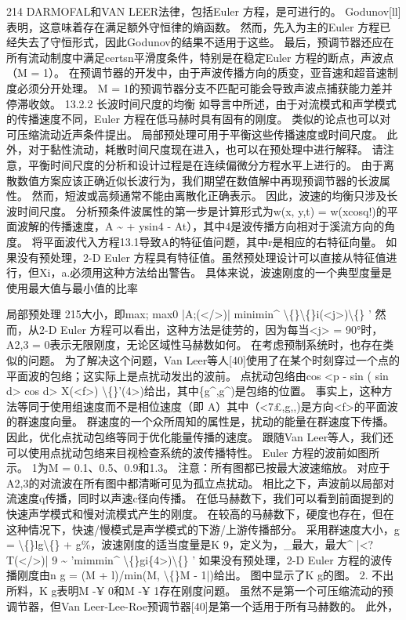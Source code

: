 \documentclass[UTF8,11pt,a4paper,openany,fontset=fandol]{ctexbook}
\begin{document}
214 DARMOFAL和VAN LEER法律，包括Euler 方程，是可进行的。 Godunov[ll]表明，这意味着存在满足额外守恒律的熵函数。 然而，先入为主的Euler 方程已经失去了守恒形式，因此Godunov的结果不适用于这些。 最后，预调节器还应在所有流动制度中满足certsn平滑度条件，特别是在稳定Euler 方程的断点，声波点（M = 1）。 在预调节器的开发中，由于声波传播方向的质变，亚音速和超音速制度必须分开处理。 M = 1的预调节器分支不匹配可能会导致声波点捕获能力差并停滞收敛。 13.2.2 长波时间尺度的均衡 如导言中所述，由于对流模式和声学模式的传播速度不同，Euler 方程在低马赫时具有固有的刚度。 类似的论点也可以对可压缩流动近声条件提出。 局部预处理可用于平衡这些传播速度或时间尺度。 此外，对于黏性流动，耗散时间尺度现在进入，也可以在预处理中进行解释。 请注意，平衡时间尺度的分析和设计过程是在连续偏微分方程水平上进行的。 由于离散数值方案应该正确近似长波行为，我们期望在数值解中再现预调节器的长波属性。 然而，短波或高频通常不能由离散化正确表示。 因此，波速的均衡只涉及长波时间尺度。 分析预条件波属性的第一步是计算形式为w(x, y,t) = w(xcosq!)的平面波解的传播速度，A \textasciitilde{} + ysin4 - At），其中4是波传播方向相对于溪流方向的角度。 将平面波代入方程13.1导致A的特征值问题，其中r是相应的右特征向量。 如果没有预处理，2-D Euler 方程具有特征值。虽然预处理设计可以直接从特征值进行，但Xi，a.必须用这种方法给出警告。 具体来说，波速刚度的一个典型度量是使用最大值与最小值的比率

局部预处理 215大小，即max; max0 |A;(</>)| minimin\textasciicircum{} \textbackslash\{\}\textbackslash\{\}i(<j>)\textbackslash\{\} ' 然而，从2-D Euler 方程可以看出，这种方法是徒劳的，因为每当<j> = 90°时，A2,3 = 0表示无限刚度，无论区域性马赫数如何。 在考虑预制系统时，也存在类似的问题。 为了解决这个问题，Van Leer等人[40]使用了在某个时刻穿过一个点的平面波的包络；这实际上是点扰动发出的波前。 点扰动包络由cos <p - sin ( sin d> cos d> X(<f>) \textbackslash\{\}'(4>)给出，其中\{g\textasciicircum{},g\textasciicircum{})是包络的位置。 事实上，这种方法等同于使用组速度而不是相位速度（即 A）其中（<7£,g,,)是方向<f>的平面波的群速度向量。 群速度的一个众所周知的属性是，扰动的能量在群速度下传播。 因此，优化点扰动包络等同于优化能量传播的速度。 跟随Van Leer等人，我们还可以使用点扰动包络来目视检查系统的波传播特性。 Euler 方程的波前如图所示。 1为M = 0.1、0.5、0.9和1.3。 注意：所有图都已按最大波速缩放。 对应于A2,3的对流波在所有图中都清晰可见为孤立点扰动。 相比之下，声波前以局部对流速度q传播，同时以声速c径向传播。 在低马赫数下，我们可以看到前面提到的快速声学模式和慢对流模式产生的刚度。 在较高的马赫数下，硬度也存在，但在这种情况下，快速/慢模式是声学模式的下游/上游传播部分。 采用群速度大小，g = \textbackslash\{\}lg\textbackslash\{\} + g\%，波速刚度的适当度量是K 9，定义为，\_最大，最大\textasciicircum{} |<? T(</>)| 9 \textasciitilde{} 'mimmin\textasciicircum{} \textbackslash\{\}gi\{4>)\textbackslash\{\} ' 如果没有预处理，2-D Euler 方程的波传播刚度由n g = (M + l)/min(M, \textbackslash\{\}M - 1|)给出。 图中显示了K g的图。 2. 不出所料，K g表明M -¥ 0和M -¥ 1存在刚度问题。 虽然不是第一个可压缩流动的预调节器，但Van Leer-Lee-Roe预调节器[40]是第一个适用于所有马赫数的。 此外，
\end{document}
